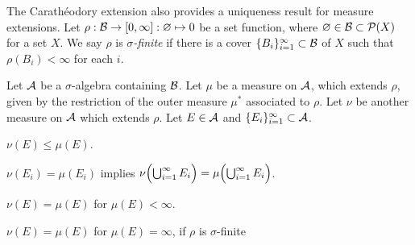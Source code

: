 \documentclass{../../large}
\begin{document}
\begin{prb}
The Carath\'eodory extension also provides a uniqueness result for measure extensions.
Let $\rho:\mathcal{B}\to[0,\infty]:\varnothing\mapsto0$ be a set function, where $\varnothing\in\mathcal{B}\subset\mathcal{P}(X)$ for a set $X$.
We say $\rho$ is \emph{$\sigma$-finite} if there is a cover $\{B_i\}_{i=1}^\infty\subset\mathcal{B}$ of $X$ such that $\rho(B_i)<\infty$ for each $i$.

Let $\mathcal{A}$ be a $\sigma$-algebra containing $\mathcal{B}$.
Let $\mu$ be a measure on $\mathcal{A}$, which extends $\rho$, given by the restriction of the outer measure $\mu^*$ associated to $\rho$.
Let $\nu$ be another measure on $\mathcal{A}$ which extends $\rho$.
Let $E\in\mathcal{A}$ and $\{E_i\}_{i=1}^\infty\subset\mathcal{A}$.
\begin{parts}
\item $\nu(E)\le\mu(E)$.
\item $\nu(E_i)=\mu(E_i)$ implies $\nu\Bigl(\bigcup_{i=1}^\infty E_i\Bigr)=\mu\Bigl(\bigcup_{i=1}^\infty E_i\Bigr)$.
\item $\nu(E)=\mu(E)$ for $\mu(E)<\infty$.
\item $\nu(E)=\mu(E)$ for $\mu(E)=\infty$, if $\rho$ is $\sigma$-finite
\end{parts}
\end{prb}
\end{document}
